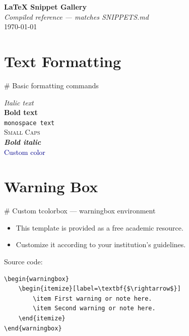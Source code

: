 \documentclass[12pt, a4paper]{article}
\newcommand{\snippetlabel}[1]{%
    \vspace{0.5em}%
    {\small\ttfamily\color{gray} \# #1}%
    \vspace{0.2em}%
}
\begin{document}
\begin{center}
    {\Large \textbf{LaTeX Snippet Gallery}} \\[0.3cm]
    {\large \textit{Compiled reference — matches SNIPPETS.md}} \\[0.2cm]
    {\small \today}
\end{center}

\tableofcontents
\clearpage

\section{Text Formatting}

\snippetlabel{Basic formatting commands}

\begin{LTXexample}[pos=r, width=0.4]
\textit{Italic text} \\
\textbf{Bold text} \\
\texttt{monospace text} \\
\textsc{Small Caps} \\
\textit{\textbf{Bold italic}} \\
\textcolor{darkblue}{Custom color}
\end{LTXexample}

\section{Warning Box}

\snippetlabel{Custom tcolorbox — warningbox environment}

\begin{warningbox}
    \begin{itemize}[label=\textbf{$\rightarrow$}]
        \item This template is provided as a free academic resource.
        \item Customize it according to your institution's guidelines.
    \end{itemize}
\end{warningbox}

\vspace{0.5em}
{\small\color{gray}Source code:}
\begin{lstlisting}[language={[LaTeX]TeX}, basicstyle=\ttfamily\small,
                   frame=single, backgroundcolor=\color{gray!5}]
\begin{warningbox}
    \begin{itemize}[label=\textbf{$\rightarrow$}]
        \item First warning or note here.
        \item Second warning or note here.
    \end{itemize}
\end{warningbox}
\end{lstlisting}
\end{document}
